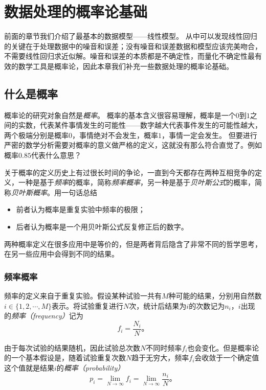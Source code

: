 \chapter{数据处理的概率论基础}

前面的章节我们介绍了最基本的数据模型——线性模型。
从中可以发现线性回归的关键在于处理数据中的噪音和误差；没有噪音和误差数据和模型应该完美吻合，不需要线性回归求近似解。噪音和误差的本质都是不确定性，而量化不确定性最有效的数学工具是概率论，因此本章我们补充一些数据处理的概率论基础。

\section{什么是概率}
概率论的研究对象自然是\emph{概率}。
概率的基本含义很容易理解，概率是一个$0$到$1$之间的实数，代表某件事情发生的可能性——数字越大代表事件发生的可能性越大，两个极端分别是概率$0$，事情绝对不会发生，概率$1$，事情一定会发生。
但要进行严密的数学分析需要对概率的意义做严格的定义，这就没有那么符合直觉了。例如概率$0.85$代表什么意思？

关于概率的定义历史上有过很长时间的争论，一直到今天都存在两种互相竞争的定义，一种是基于\emph{频率}的概率，简称\emph{频率概率}，另一种是基于\emph{贝叶斯公式}的概率，简称\emph{贝叶斯概率}。用一句话总结
\begin{itemize}
    \item 前者认为概率是重复实验中频率的极限；
    \item 后者认为概率是一个用贝叶斯公式反复修正后的数字。
\end{itemize}
两种概率定义在很多应用中是等价的，但是两者背后隐含了非常不同的哲学思考，在另一些应用中会得到不同的结果。

\subsection{频率概率}

频率的定义来自于重复实验。假设某种试验一共有$M$种可能的结果，分别用自然数$i\in\{1,2,\cdots, M\}$表示。将试验重复进行$N$次，统计后结果为$i$的次数记为$n_i$，$i$出现的\emph{频率（frequency）}记为
\begin{equation}
    f_i=\frac{N_i}{N}。
\end{equation}

由于每次试验的结果随机，因此试验总次数$N$不同时频率$f_i$也会变化。但是概率论的一个基本假设是，随着试验重复次数$N$趋于无穷大，频率$f_i$会收敛于一个确定值这个值就是结果$i$的\emph{概率（probability）}
\begin{equation}
    p_i=\lim_{N\to\infty}f_i=\lim_{N\to\infty}\frac{n_i}{N}。
\end{equation}


